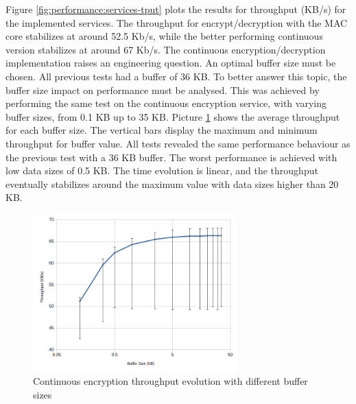 Figure \ref{fig:performance:services-tput} plots the results for throughput (KB/s) for the implemented services.
The throughput for encrypt/decryption with the MAC core stabilizes at around 52.5 Kb/s, while the better performing continuous version stabilizes at around 67 Kb/s.
The continuous encryption/decryption implementation raises an engineering question. An optimal buffer size must be chosen. All previous tests had a buffer of 36 KB.
To better answer this topic, the buffer size impact on performance must be analysed.
This was achieved by performing the same test on the continuous encryption service, with varying buffer sizes, from 0.1 KB up to 35 KB. Picture \ref{fig:performance:buffer-tput} shows the average throughput for each buffer size. The vertical bars display the maximum and minimum throughput for buffer value.
All tests revealed the same performance behaviour as the previous test with a 36 KB buffer. The worst performance is achieved with low data sizes of 0.5 KB. The time evolution is linear, and the throughput eventually stabilizes around the maximum value with data sizes higher than 20 KB.

\begin{figure}[h!]
	\centering
	\includegraphics[width=0.7\textwidth]{./Images/buffer-tput.png}
	\caption{Continuous encryption throughput evolution with different buffer sizes}
	\label{fig:performance:buffer-tput}
\end{figure}


